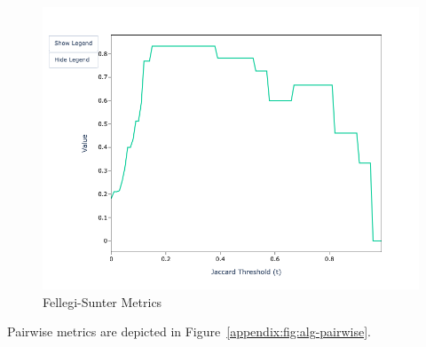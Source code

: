 \documentclass[a4paper,twoside]{article}
\begin{document}
\begin{figure}[htbp]
        \begin{minipage}{0.32\textwidth}
            \centering
            \caption*{$F_1$}
            \includegraphics[width=\textwidth]{sample-usage/mini-fs-f1}
        \end{minipage}
        \caption{Fellegi-Sunter Metrics}\label{appendix:fig:fs-figures}
    \end{figure}

    Pairwise metrics are depicted in Figure~\ref{appendix:fig:alg-pairwise}.
\end{document}
